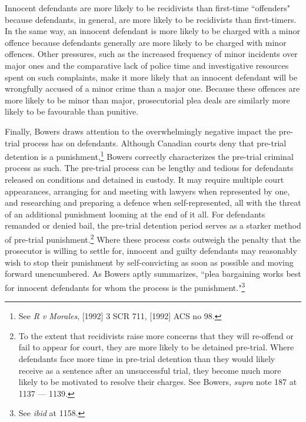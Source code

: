 Innocent defendants are more likely to be recidivists than first-time ``offenders" because defendants, in general, are more likely to be recidivists than first-timers. In the same way, an innocent defendant is more likely to be charged with a minor offence because defendants generally are more likely to be charged with minor offences. Other pressures, such as the increased frequency of minor incidents over major ones and the comparative lack of police time and investigative resources spent on such complaints, make it more likely that an innocent defendant will be wrongfully accused of a minor crime than a major one. Because these offences are more likely to be minor than major, prosecutorial plea deals are similarly more likely to be favourable than punitive.

Finally, Bowers draws attention to the overwhelmingly negative impact the pre-trial process has on defendants. Although Canadian courts deny that pre-trial detention is a punishment,\footnote{See \textit{R v Morales}, [1992] 3 SCR 711, [1992] ACS no 98.} Bowers correctly characterizes the pre-trial criminal process as such. The pre-trial process can be lengthy and tedious for defendants released on conditions and detained in custody. It may require multiple court appearances, arranging for and meeting with lawyers when represented by one, and researching and preparing a defence when self-represented, all with the threat of an additional punishment looming at the end of it all. For defendants remanded or denied bail, the pre-trial detention period serves as a starker method of pre-trial punishment.\footnote{To the extent that recidivists raise more concerns that they will re-offend or fail to appear for court, they are more likely to be detained pre-trial. Where defendants face more time in pre-trial detention than they would likely receive as a sentence after an unsuccessful trial, they become much more likely to be motivated to resolve their charges. See Bowers, \textit{supra} note 187 at 1137 — 1139.} Where these process costs outweigh the penalty that the prosecutor is willing to settle for, innocent and guilty defendants may reasonably wish to stop their punishment by self-convicting as soon as possible and moving forward unencumbered. As Bowers aptly summarizes, ``plea bargaining works best for innocent defendants for whom the process is the punishment."\footnote{See \textit{ibid} at 1158.}

